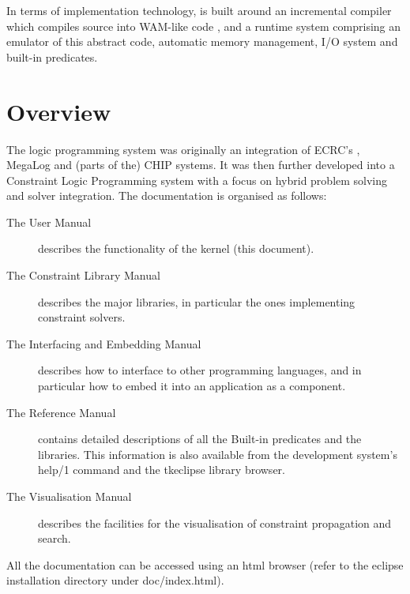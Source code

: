 In terms of implementation technology, {\eclipse} is built around an
incremental compiler which compiles {\eclipse} source into WAM-like
code \cite{warren83}, and a runtime system comprising an emulator of
this abstract code, automatic memory management, I/O system and
built-in predicates.



\section{Overview}
The {\eclipse} logic programming system was originally an integration of
ECRC's \sepia, MegaLog and (parts of the) CHIP systems.
It was then further developed into a Constraint Logic Programming system
with a focus on hybrid problem solving and solver integration.
The documentation is organised as follows:
\begin{description}
\item [The User Manual] describes the functionality
of the {\eclipse} kernel (this document).
\item [The Constraint Library Manual] describes the major {\eclipse} libraries,
in particular the ones implementing constraint solvers.
\item [The Interfacing and Embedding Manual] describes how to interface
{\eclipse} to other programming languages, and in particular how to embed
it into an application as a component.
\item [The Reference Manual] contains detailed descriptions of all the
Built-in predicates and the libraries. This information is also available
from the development system's help/1 command and the tkeclipse library
browser.
\item [The Visualisation Manual] describes the facilities for the
visualisation of constraint propagation and search.
\end{description}
All the documentation can be accessed using an html browser
(refer to the eclipse installation directory under doc/index.html).

